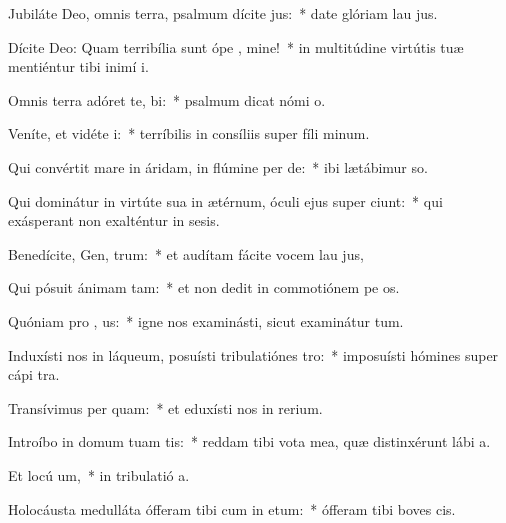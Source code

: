 \item Jubiláte Deo, omnis terra, psalmum dícite  jus:~* date glóriam lau jus.
\item Dícite Deo: Quam terribília sunt ópe , mine!~* in multitúdine virtútis tuæ mentiéntur tibi inimí i.
\item Omnis terra adóret te,   bi:~* psalmum dicat nómi o.
\item Veníte, et vidéte  i:~* terríbilis in consíliis super fíli minum.
\item Qui convértit mare in áridam, in flúmine per de:~* ibi lætábimur  so.
\item Qui dominátur in virtúte sua in ætérnum, óculi ejus super  ciunt:~* qui exásperant non exalténtur in sesis.
\item Benedícite, Gen,  trum:~* et audítam fácite vocem lau jus,
\item Qui pósuit ánimam   tam:~* et non dedit in commotiónem pe os.
\item Quóniam pro , us:~* igne nos examinásti, sicut examinátur tum.
\item Induxísti nos in láqueum, posuísti tribulatiónes   tro:~* imposuísti hómines super cápi tra.
\item Transívimus per   quam:~* et eduxísti nos in rerium.
\item Introíbo in domum tuam  tis:~* reddam tibi vota mea, quæ distinxérunt lábi a.
\item Et locú   um,~* in tribulatió a.
\item Holocáusta medulláta ófferam tibi cum in etum:~* ófferam tibi boves  cis.
